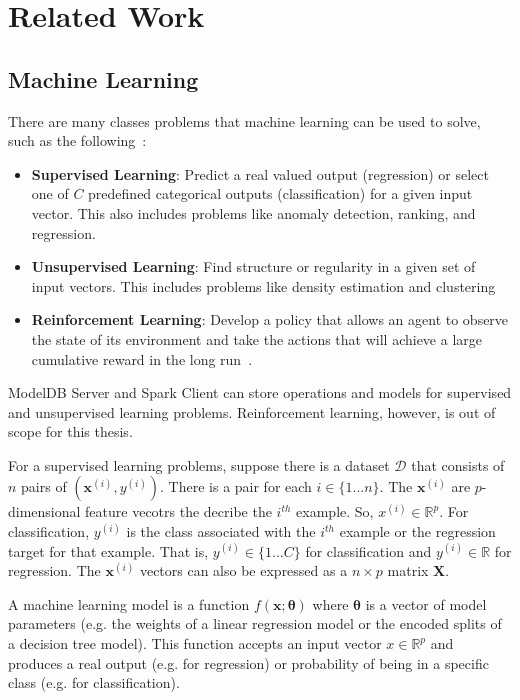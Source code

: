 \chapter{Related Work}

\section{Machine Learning}
There are many classes problems that machine learning can be used to solve, such
as the following~\cite{introtoml}:

\begin{itemize}
  \item \textbf{Supervised Learning}: Predict a real valued output (regression)
    or select one of $C$ predefined categorical outputs (classification)
    for a given input vector. This also includes problems like anomaly detection,
    ranking, and regression.
  \item \textbf{Unsupervised Learning}: Find structure or regularity in a given
    set of input vectors. This includes problems like density estimation and 
    clustering
  \item \textbf{Reinforcement Learning}: Develop a policy that allows an agent
    to observe the state of its environment and take the actions that will 
    achieve a large cumulative reward in the long run~\cite{introtorl}.
\end{itemize}

ModelDB Server and Spark Client can store operations and models for supervised
and unsupervised learning problems. Reinforcement learning, however, is out
of scope for this thesis.

For a supervised learning problems, suppose there is a dataset $\mathcal{D}$ that
consists of $n$ pairs of $(\textbf{x}^{(i)}, y^{(i)})$. There is a
pair for each $i \in \{{1...n}\}$. The $\textbf{x}^{(i)}$ are $p$-dimensional feature
vecotrs the decribe the $i^{th}$ example. So, $x^{(i)} \in \mathbb{R}^{p}$. 
For classification, $y^{(i)}$ is the class associated with the $i^{th}$ example or
the regression target for that example. That is, $y^{(i)} \in \{1...C\}$ for classification
and $y^{(i)} \in \mathbb{R}$ for regression. The $\textbf{x}^{(i)}$ vectors
can also be expressed as a $n \times p$ matrix $\textbf{X}$.

A machine learning model is a function $f(\textbf{x}; \boldsymbol{\theta})$ where
$\boldsymbol{\theta}$ is a vector of model parameters (e.g. the weights of a linear regression
model or the encoded splits of a decision tree model). This function accepts an 
input vector $x \in \mathbb{R}^{p}$ and produces a real output (e.g. for regression)
or probability of being in a specific class (e.g. for classification).

